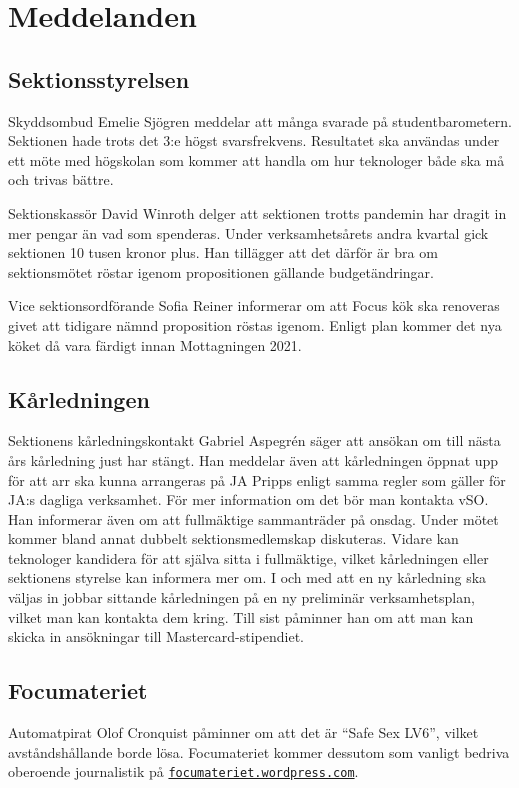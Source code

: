 \documentclass[hidelinks]{sektionsmote}
\begin{document}
\section{Meddelanden}
\subsection{Sektionsstyrelsen}
Skyddsombud Emelie Sjögren meddelar att många svarade på studentbarometern.
Sektionen hade trots det 3:e högst svarsfrekvens.
Resultatet ska användas under ett möte med högskolan som kommer att handla om hur teknologer både ska må och trivas bättre.

Sektionskassör David Winroth delger att sektionen trotts pandemin har dragit in mer pengar än vad som spenderas.
Under verksamhetsårets andra kvartal gick sektionen 10 tusen kronor plus.
Han tillägger att det därför är bra om sektionsmötet röstar igenom propositionen gällande budgetändringar.

Vice sektionsordförande Sofia Reiner informerar om att Focus kök ska renoveras givet att tidigare nämnd proposition röstas igenom.
Enligt plan kommer det nya köket då vara färdigt innan Mottagningen 2021.

\subsection{Kårledningen}
Sektionens kårledningskontakt Gabriel Aspegrén säger att ansökan om till nästa års kårledning just har stängt.
Han meddelar även att kårledningen öppnat upp för att arr ska kunna arrangeras på JA Pripps enligt samma regler som gäller för JA:s dagliga verksamhet.
För mer information om det bör man kontakta vSO. %
Han informerar även om att fullmäktige sammanträder på onsdag.
Under mötet kommer bland annat dubbelt sektionsmedlemskap diskuteras.
Vidare kan teknologer kandidera för att själva sitta i fullmäktige, vilket kårledningen eller sektionens styrelse kan informera mer om.
I och med att en ny kårledning ska väljas in jobbar sittande kårledningen på en ny preliminär verksamhetsplan, vilket man kan kontakta dem kring.
Till sist påminner han om att man kan skicka in ansökningar till Mastercard-stipendiet. %

\subsection{Focumateriet}
Automatpirat Olof Cronquist påminner om att det är \enquote{Safe Sex LV6}, vilket avståndshållande borde lösa.
Focumateriet kommer dessutom som vanligt bedriva oberoende journalistik på \newline\href{https://focumateriet.wordpress.com}{\texttt{focumateriet.wordpress.com}}.
\end{document}
